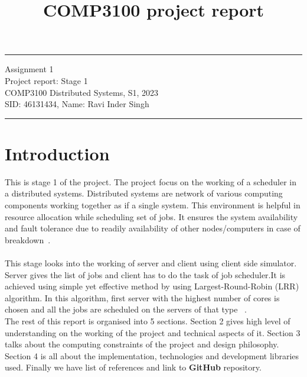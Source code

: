 \documentclass[a4paper]{article} %
\begin{document}
\title{COMP3100 project report} %
\fancyhead[C]{}
\hrule \medskip %
\begin{minipage}{1\textwidth} %
\centering 
\large %
Assignment 1 \\
Project report: Stage 1\\ %
COMP3100 Distributed Systems, S1, 2023\\
\normalsize %
SID: 46131434, Name: Ravi Inder Singh
\end{minipage}
\medskip\hrule %
\bigskip
\tableofcontents

\section{Introduction}
\label{sec:section1}

This is stage 1 of the project. The project focus on the working of a scheduler in a distributed systems. Distributed systems are network of various computing components working together as if a single system. This environment is helpful in resource allocation while scheduling set of jobs. It ensures the system availability and fault tolerance due to readily availability of other nodes/computers in case of breakdown~\cite{splunk_2021_what}. \\ 
\\
This stage looks into the working of server and client using client side simulator. Server gives the list of jobs and client has to do the task of job scheduler.It is achieved using simple yet effective method by using Largest-Round-Robin (LRR) algorithm. In this algorithm, first server with the highest number of cores is chosen and all the jobs are scheduled on the servers of that type ~\cite{arshad_2023_what}. 
\\

The rest of this report is organised into 5 sections. Section 2 gives high level of understanding on the working of the project and technical aspects of it. Section 3 talks about the computing constraints of the project and design philosophy. Section 4 is all about the implementation, technologies and development libraries used. Finally we have list of references and link to \textbf{GitHub} repository. 
\end{document}
